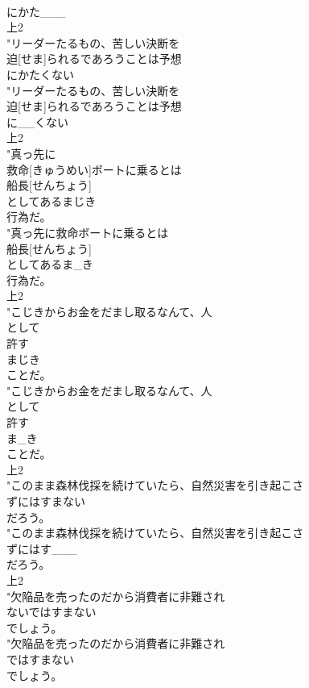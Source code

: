 \documentclass[8pt]{extreport}
\begin{document}
\begin{CJK}{UTF8}{min}
\\	にかた___
\\	上2
\\	"リーダーたるもの、苦しい決断を
\\	迫[せま]られるであろうことは予想
\\	にかたくない
\\	"リーダーたるもの、苦しい決断を
\\	迫[せま]られるであろうことは予想
\\	に__くない
\\	上2
\\	"真っ先に
\\	救命[きゅうめい]ボートに乗るとは
\\	船長[せんちょう]
\\	としてあるまじき
\\	行為だ。
\\	"真っ先に救命ボートに乗るとは
\\	船長[せんちょう]
\\	としてあるま_き
\\	行為だ。
\\	上2
\\	"こじきからお金をだまし取るなんて、人
\\	として
\\	許す
\\	まじき
\\	ことだ。
\\	"こじきからお金をだまし取るなんて、人
\\	として
\\	許す
\\	ま_き
\\	ことだ。
\\	上2
\\	"このまま森林伐採を続けていたら、自然災害を引き起こさ
\\	ずにはすまない
\\	だろう。
\\	"このまま森林伐採を続けていたら、自然災害を引き起こさ
\\	ずにはす___
\\	だろう。
\\	上2
\\	"欠陥品を売ったのだから消費者に非難され
\\	ないではすまない
\\	でしょう。
\\	"欠陥品を売ったのだから消費者に非難され
\\	ではすまない
\\	でしょう。

\end{CJK}
\end{document}
